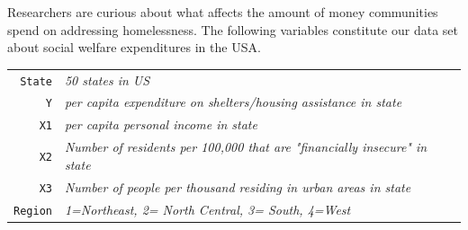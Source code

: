 \documentclass[12pt,letterpaper]{article}
\begin{document}
\noindent Researchers are curious about what affects the amount of money communities spend on addressing homelessness. The following variables constitute our data set about social welfare expenditures in the USA. \\
\vspace{.5cm}


\begin{tabular}{r|l}
	\texttt{State} &\emph{50 states in US} \\
	\texttt{Y} & \emph{per capita expenditure on shelters/housing assistance in state}\\
	\texttt{X1} &\emph{per capita personal income in state} \\
	\texttt{X2} &  \emph{Number of residents per 100,000 that are "financially insecure" in state}\\
	\texttt{X3} &  \emph{Number of people per thousand residing in urban areas in state} \\
	\texttt{Region} &  \emph{1=Northeast, 2= North Central, 3= South, 4=West} \\
\end{tabular}
\end{document}
